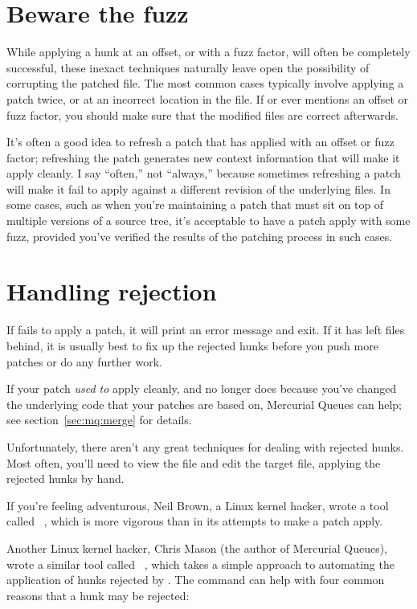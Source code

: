 \section{Beware the fuzz}

While applying a hunk at an offset, or with a fuzz factor, will often
be completely successful, these inexact techniques naturally leave
open the possibility of corrupting the patched file.  The most common
cases typically involve applying a patch twice, or at an incorrect
location in the file.  If  or  ever
mentions an offset or fuzz factor, you should make sure that the
modified files are correct afterwards.  

It's often a good idea to refresh a patch that has applied with an
offset or fuzz factor; refreshing the patch generates new context
information that will make it apply cleanly.  I say ``often,'' not
``always,'' because sometimes refreshing a patch will make it fail to
apply against a different revision of the underlying files.  In some
cases, such as when you're maintaining a patch that must sit on top of
multiple versions of a source tree, it's acceptable to have a patch
apply with some fuzz, provided you've verified the results of the
patching process in such cases.

\section{Handling rejection}

If  fails to apply a patch, it will print an error
message and exit.  If it has left  files behind, it is
usually best to fix up the rejected hunks before you push more patches
or do any further work.

If your patch \emph{used to} apply cleanly, and no longer does because
you've changed the underlying code that your patches are based on,
Mercurial Queues can help; see section~\ref{sec:mq:merge} for details.

Unfortunately, there aren't any great techniques for dealing with
rejected hunks.  Most often, you'll need to view the 
file and edit the target file, applying the rejected hunks by hand.

If you're feeling adventurous, Neil Brown, a Linux kernel hacker,
wrote a tool called ~\cite{web:wiggle}, which is more
vigorous than  in its attempts to make a patch apply.

Another Linux kernel hacker, Chris Mason (the author of Mercurial
Queues), wrote a similar tool called
~\cite{web:mpatch}, which takes a simple approach to
automating the application of hunks rejected by .  The
 command can help with four common reasons that a hunk
may be rejected:

